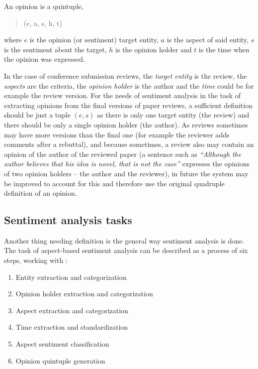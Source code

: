 \begin{aquote}{\cite[p. 463]{liu_2006}}
An opinion is a quintuple,\begin{quote} (e, a, s, h, t)\end{quote}where $e$ is the opinion (or sentiment) target entity, $a$ is the aspect of said entity, $s$ is the sentiment about the target, $h$ is the opinion holder and $t$ is the time when the opinion was expressed. 
\end{aquote}
In the case of conference submission reviews, the \textit{target entity} is the review, the \textit{aspects} are the criteria, the \textit{opinion holder} is the author and the \textit{time} could be for example the review version. For the needs of sentiment analysis in the task of extracting opinions from the final versions of paper reviews, a sufficient definition should be just a tuple $(e, s)$ as there is only one target entity (the review) and there should be only a single opinion holder (the author). As reviews sometimes may have more versions than the final one (for example the reviewer adds comments after a rebuttal), and because sometimes, a review also may contain an opinion of the author of the reviewed paper (a sentence such as \textit{``Although the author believes that his idea is novel, that is not the case''} expresses the opinions of two opinion holders -- the author and the reviewer), in future the system may be improved to account for this and therefore use the original quadruple definition of an opinion.


\subsection{Sentiment analysis tasks}
Another thing needing definition is the general way sentiment analysis is done.
The task of aspect-based sentiment analysis can be described as a process of six steps, working with \cite{liu_2015}:
\begin{enumerate}
    \item Entity extraction and categorization
    \item Opinion holder extraction and categorization
    \item Aspect extraction and categorization
    \item Time extraction and standardization
    \item Aspect sentiment classification
    \item Opinion quintuple generation
\end{enumerate}

